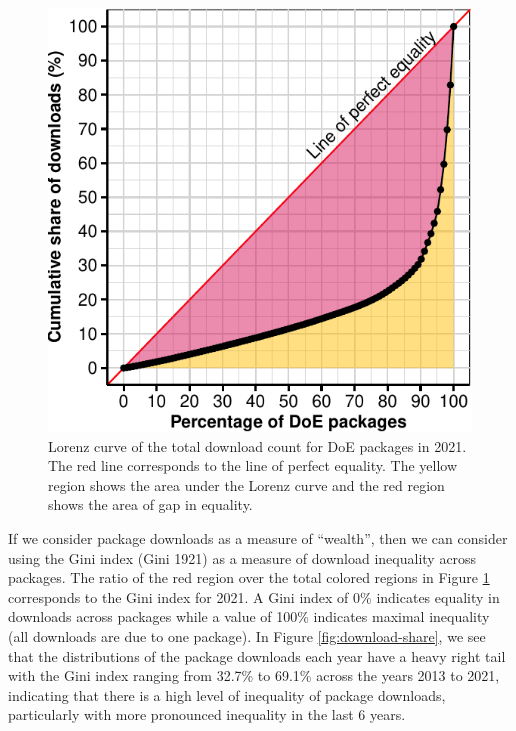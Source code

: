 \documentclass{article}
\begin{document}
\begin{figure}[htbp]

{\centering \includegraphics{figures/plot-lorenz-1} 

}

\caption{Lorenz curve of the total download count for DoE packages in 2021. The red line corresponds to the line of perfect equality. The yellow region shows the area under the Lorenz curve and the red region shows the area of gap in equality.}\label{fig:plot-lorenz}
\end{figure}

If we consider package downloads as a measure of ``wealth'', then we can
consider using the Gini index (Gini 1921) as a measure of download
inequality across packages. The ratio of the red region over the total
colored regions in Figure \ref{fig:plot-lorenz} corresponds to the Gini
index for 2021. A Gini index of 0\% indicates equality in downloads
across packages while a value of 100\% indicates maximal inequality (all
downloads are due to one package). In Figure \ref{fig:download-share},
we see that the distributions of the package downloads each year have a
heavy right tail with the Gini index ranging from 32.7\% to 69.1\%
across the years 2013 to 2021, indicating that there is a high level of
inequality of package downloads, particularly with more pronounced
inequality in the last 6 years.
\end{document}
